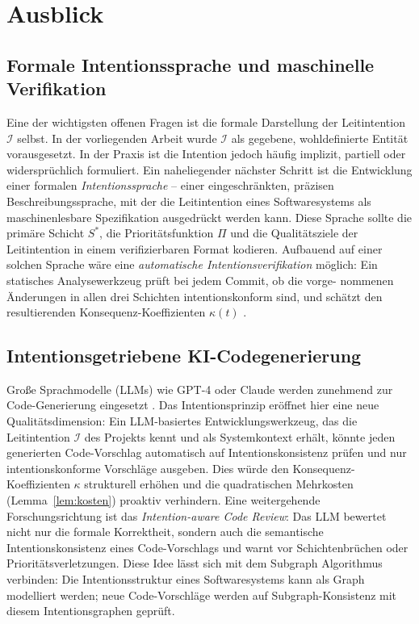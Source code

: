 ﻿\documentclass[a4paper,12pt]{article}
\theoremstyle{definition}
\begin{document}
\section{Ausblick}

\subsection{Formale Intentionssprache und maschinelle Verifikation}

Eine der wichtigsten offenen Fragen ist die formale Darstellung der
Leitintention $\mathcal{I}$ selbst. In der vorliegenden Arbeit wurde
$\mathcal{I}$ als gegebene, wohldefinierte Entität vorausgesetzt. In
der Praxis ist die Intention jedoch häufig implizit, partiell oder
widersprüchlich formuliert. Ein naheliegender nächster Schritt ist die
Entwicklung einer formalen \emph{Intentionssprache} -- einer
eingeschränkten, präzisen Beschreibungssprache, mit der die Leitintention
eines Softwaresystems als maschinenlesbare Spezifikation ausgedrückt
werden kann. Diese Sprache sollte die primäre Schicht $S^*$, die
Prioritätsfunktion $\Pi$ und die Qualitätsziele der Leitintention
in einem verifizierbaren Format kodieren. Aufbauend auf einer solchen
Sprache wäre eine \emph{automatische Intentionsverifikation} möglich:
Ein statisches Analysewerkzeug prüft bei jedem Commit, ob die vorge-
nommenen Änderungen in allen drei Schichten intentionskonform sind,
und schätzt den resultierenden Konsequenz-Koeffizienten $\kappa(t)$
\cite{bass2012software, clements2010documenting}.

\subsection{Intentionsgetriebene KI-Codegenerierung}

Große Sprachmodelle (LLMs) wie GPT-4 oder Claude werden zunehmend
zur Code-Generierung eingesetzt \cite{brown2020gpt3}. Das
Intentionsprinzip eröffnet hier eine neue Qualitätsdimension: Ein
LLM-basiertes Entwicklungswerkzeug, das die Leitintention $\mathcal{I}$
des Projekts kennt und als Systemkontext erhält, könnte jeden generierten
Code-Vorschlag automatisch auf Intentionskonsistenz prüfen und nur
intentionskonforme Vorschläge ausgeben. Dies würde den Konsequenz-
Koeffizienten $\kappa$ strukturell erhöhen und die quadratischen
Mehrkosten (Lemma~\ref{lem:kosten}) proaktiv verhindern. Eine
weitergehende Forschungsrichtung ist das \emph{Intention-aware Code
Review}: Das LLM bewertet nicht nur die formale Korrektheit, sondern
auch die semantische Intentionskonsistenz eines Code-Vorschlags und
warnt vor Schichtenbrüchen oder Prioritätsverletzungen.
Diese Idee lässt sich mit dem Subgraph Algorithmus \cite{epp2026subgraph}
verbinden: Die Intentionsstruktur eines Softwaresystems kann als Graph
modelliert werden; neue Code-Vorschläge werden auf Subgraph-Konsistenz
mit diesem Intentionsgraphen geprüft.
\end{document}
